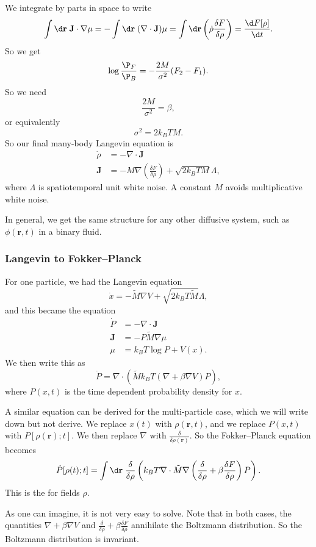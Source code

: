 \documentclass[a4paper]{article}
\begin{document}
We integrate by parts in space to write
\[
  \int \d \mathbf{r}\; \mathbf{J} \cdot \nabla \mu = - \int \d \mathbf{r}\; (\nabla \cdot \mathbf{J}) \mu = \int \d \mathbf{r} \left(\dot{\rho} \frac{\delta F}{\delta \rho}\right) = \frac{\d F[\rho]}{\d t}.
\]
So we get
\[
  \log \frac{\P_F}{\P_B} = - \frac{2M}{\sigma^2} (F_2 - F_1).
\]
So we need
\[
  \frac{2M}{\sigma^2} = \beta,
\]
or equivalently
\[
  \sigma^2 = 2k_B T M.
\]
So our final many-body Langevin equation is
\begin{align*}
  \dot{\rho} &= - \nabla \cdot \mathbf{J}\\
  \mathbf{J} &= - M \nabla \left(\frac{\delta F}{\delta \rho}\right) + \sqrt{2k_B T M} \Lambda,
\end{align*}
where $\Lambda$ is spatiotemporal unit white noise. A constant $M$ avoids multiplicative white noise.

In general, we get the same structure for any other diffusive system, such as $\phi(\mathbf{r}, t)$ in a binary fluid.
\subsubsection*{Langevin to Fokker--Planck}
For one particle, we had the Langevin equation
\[
  \dot{x} = - \tilde{M} \nabla V + \sqrt{2k_B T \tilde{M}} \Lambda,
\]
and this became the equation
\begin{align*}
  \dot{P} &= - \nabla \cdot \mathbf{J}\\
  \mathbf{J} &= -P \tilde{M} \nabla \mu\\
  \mu &= k_B T \log P + V(x).
\end{align*}
We then write this as
\[
  \dot{P} = \nabla \cdot \left(\tilde{M} k_B T \left(\nabla + \beta \nabla V\right)P\right),
\]
where $P(x, t)$ is the time dependent probability density for $x$.

A similar equation can be derived for the multi-particle case, which we will write down but not derive. We replace $x(t)$ with $\rho(\mathbf{r}, t)$, and we replace $P(x, t)$ with $P[\rho(\mathbf{r}); t]$. We then replace $\nabla$ with $\frac{\delta}{\delta \rho(\mathbf{r})}$. So the Fokker--Planck equation becomes
\[
  \dot{P}[\rho(t); t] = \int \d \mathbf{r} \; \frac{\delta}{\delta \rho} \left(k_B T \nabla \cdot \tilde{M} \nabla \left(\frac{\delta}{\delta \rho} + \beta \frac{\delta F}{\delta \rho}\right)P\right).
\]
This is the  for fields $\rho$.

As one can imagine, it is not very easy to solve. Note that in both cases, the quantities $\nabla + \beta \nabla V$ and $\frac{\delta}{\delta \rho} + \beta \frac{\delta F}{\delta \rho}$ annihilate the Boltzmann distribution. So the Boltzmann distribution is invariant.
\end{document}

